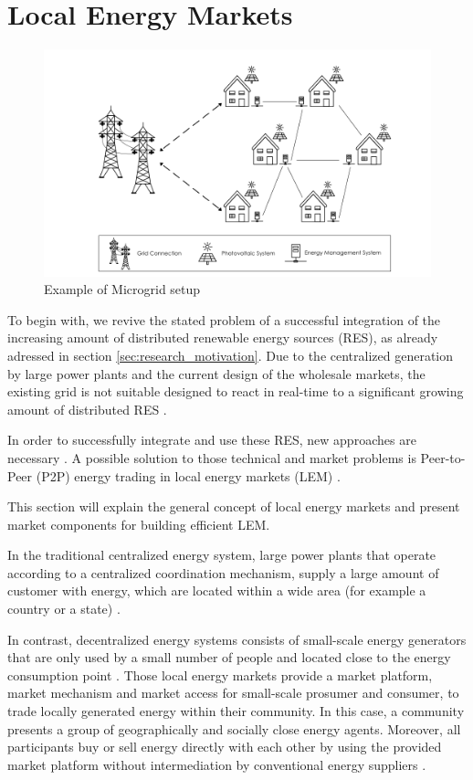 \section{Local Energy Markets}
\label{sec:lem}

\begin{figure}[htbp]
	\centering
	\includegraphics[width=.9\linewidth]{./figures/microgrid_1024x.png}
	\caption{Example of Microgrid setup}
	\label{figure:microgrid}
\end{figure}

To begin with, we revive the stated problem of a successful integration of the increasing amount of
distributed renewable energy sources (RES), as already adressed 
in section \ref{sec:research_motivation}. Due to the centralized generation by large power plants
and the current design of the wholesale markets, the existing grid is not suitable designed
to react in real-time to a significant growing 
amount of distributed RES  .

In order to successfully integrate and use these RES, new approaches are necessary .
A possible solution to those technical and market problems is Peer-to-Peer (P2P) energy 
trading in local energy markets (LEM) . 

This section will explain the general concept of local energy markets 
and present market components for building efficient LEM. 

In the traditional centralized energy system, large power plants that operate according to a
centralized coordination mechanism, supply a large amount of customer with energy, which are located 
within a wide area (for example a country or a state) .

In contrast, decentralized energy systems consists of small-scale energy generators that are 
only used by a small number of people and located close to the energy consumption point .
Those local energy markets provide a market platform, market mechanism and market access
for small-scale prosumer and consumer, to trade locally generated energy within their community.
In this case, a community presents a group of geographically and socially close energy agents.
Moreover, all participants buy or sell energy directly with each other by using the provided market platform
without intermediation by conventional energy suppliers .

